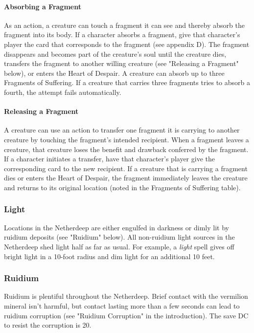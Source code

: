 \documentclass[10pt,a4,twoside,twocolumn,openany,nodeprecatedcode]{dndbook}
\begin{document}
\paragraph{Absorbing a Fragment}
As an action, a creature can touch a fragment it can see and thereby absorb the fragment into its body. If a character absorbs a fragment, give that character's player the card that corresponds to the fragment (see appendix D). The fragment disappears and becomes part of the creature's soul until the creature dies, transfers the fragment to another willing creature (see "Releasing a Fragment" below), or enters the Heart of Despair.
A creature can absorb up to three Fragments of Suffering. If a creature that carries three fragments tries to absorb a fourth, the attempt fails automatically.
\paragraph{Releasing a Fragment}
A creature can use an action to transfer one fragment it is carrying to another creature by touching the fragment's intended recipient. When a fragment leaves a creature, that creature loses the benefit and drawback conferred by the fragment. If a character initiates a transfer, have that character's player give the corresponding card to the new recipient.
If a creature that is carrying a fragment dies or enters the Heart of Despair, the fragment immediately leaves the creature and returns to its original location (noted in the Fragments of Suffering table).
\subsubsection{Light}
Locations in the Netherdeep are either engulfed in darkness or dimly lit by ruidium deposits (see "Ruidium" below). All non-ruidium light sources in the Netherdeep shed light half as far as usual. For example, a \textit{light} spell gives off bright light in a 10-foot radius and dim light for an additional 10 feet.
\subsubsection{Ruidium}
Ruidium is plentiful throughout the Netherdeep. Brief contact with the vermilion mineral isn't harmful, but contact lasting more than a few seconds can lead to ruidium corruption (see "Ruidium Corruption" in the introduction). The save DC to resist the corruption is 20.
\end{document}
